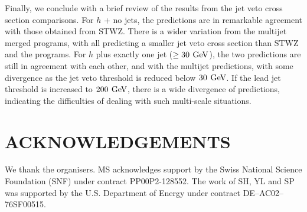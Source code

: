 Finally, we conclude with a brief review of the results from the jet veto 
cross section comparisons. For $h$ + no jets, the \NNLOPS predictions are 
in remarkable agreement with those obtained from STWZ. There is a wider 
variation from the multijet merged programs, with all predicting a smaller 
jet veto cross section than STWZ and the \NNLOPS programs. For $h$ plus 
exactly one jet ($\ge 30\,\text{\:GeV}$), the two \NNLOPS predictions are still in 
agreement with each other, and with the multijet predictions, with some 
divergence as the jet veto threshold is reduced below $30 \,\text{\:GeV}$. If the 
lead jet threshold is increased to $200\,\text{\:GeV}$, there is a wide divergence 
of predictions, indicating the difficulties of dealing with such multi-scale 
situations. 


\section*{ACKNOWLEDGEMENTS}

We thank the organisers.
MS acknowledges support by the Swiss National Science Foundation (SNF) 
under contract PP00P2-128552. 
The work of SH, YL and SP was supported by the U.S. Department of Energy 
under contract DE--AC02--76SF00515.
